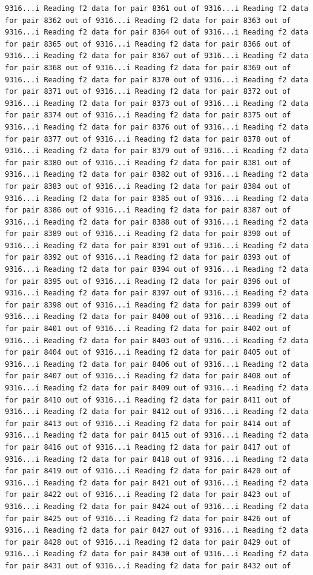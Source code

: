 \documentclass[
]{article}
\begin{document}
\begin{verbatim}
9316...i Reading f2 data for pair 8361 out of 9316...i Reading f2 data for pair 8362 out of 9316...i Reading f2 data for pair 8363 out of 9316...i Reading f2 data for pair 8364 out of 9316...i Reading f2 data for pair 8365 out of 9316...i Reading f2 data for pair 8366 out of 9316...i Reading f2 data for pair 8367 out of 9316...i Reading f2 data for pair 8368 out of 9316...i Reading f2 data for pair 8369 out of 9316...i Reading f2 data for pair 8370 out of 9316...i Reading f2 data for pair 8371 out of 9316...i Reading f2 data for pair 8372 out of 9316...i Reading f2 data for pair 8373 out of 9316...i Reading f2 data for pair 8374 out of 9316...i Reading f2 data for pair 8375 out of 9316...i Reading f2 data for pair 8376 out of 9316...i Reading f2 data for pair 8377 out of 9316...i Reading f2 data for pair 8378 out of 9316...i Reading f2 data for pair 8379 out of 9316...i Reading f2 data for pair 8380 out of 9316...i Reading f2 data for pair 8381 out of 9316...i Reading f2 data for pair 8382 out of 9316...i Reading f2 data for pair 8383 out of 9316...i Reading f2 data for pair 8384 out of 9316...i Reading f2 data for pair 8385 out of 9316...i Reading f2 data for pair 8386 out of 9316...i Reading f2 data for pair 8387 out of 9316...i Reading f2 data for pair 8388 out of 9316...i Reading f2 data for pair 8389 out of 9316...i Reading f2 data for pair 8390 out of 9316...i Reading f2 data for pair 8391 out of 9316...i Reading f2 data for pair 8392 out of 9316...i Reading f2 data for pair 8393 out of 9316...i Reading f2 data for pair 8394 out of 9316...i Reading f2 data for pair 8395 out of 9316...i Reading f2 data for pair 8396 out of 9316...i Reading f2 data for pair 8397 out of 9316...i Reading f2 data for pair 8398 out of 9316...i Reading f2 data for pair 8399 out of 9316...i Reading f2 data for pair 8400 out of 9316...i Reading f2 data for pair 8401 out of 9316...i Reading f2 data for pair 8402 out of 9316...i Reading f2 data for pair 8403 out of 9316...i Reading f2 data for pair 8404 out of 9316...i Reading f2 data for pair 8405 out of 9316...i Reading f2 data for pair 8406 out of 9316...i Reading f2 data for pair 8407 out of 9316...i Reading f2 data for pair 8408 out of 9316...i Reading f2 data for pair 8409 out of 9316...i Reading f2 data for pair 8410 out of 9316...i Reading f2 data for pair 8411 out of 9316...i Reading f2 data for pair 8412 out of 9316...i Reading f2 data for pair 8413 out of 9316...i Reading f2 data for pair 8414 out of 9316...i Reading f2 data for pair 8415 out of 9316...i Reading f2 data for pair 8416 out of 9316...i Reading f2 data for pair 8417 out of 9316...i Reading f2 data for pair 8418 out of 9316...i Reading f2 data for pair 8419 out of 9316...i Reading f2 data for pair 8420 out of 9316...i Reading f2 data for pair 8421 out of 9316...i Reading f2 data for pair 8422 out of 9316...i Reading f2 data for pair 8423 out of 9316...i Reading f2 data for pair 8424 out of 9316...i Reading f2 data for pair 8425 out of 9316...i Reading f2 data for pair 8426 out of 9316...i Reading f2 data for pair 8427 out of 9316...i Reading f2 data for pair 8428 out of 9316...i Reading f2 data for pair 8429 out of 9316...i Reading f2 data for pair 8430 out of 9316...i Reading f2 data for pair 8431 out of 9316...i Reading f2 data for pair 8432 out of 
\end{verbatim}
\end{document}
